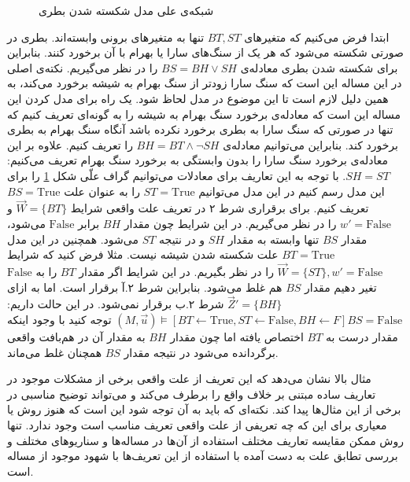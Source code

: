 \documentclass[
msc,
irfonts
]{./tex/tehran-thesis}
\newcommand{\پ}{پروژه/پایان‌نامه/رساله }
\theoremstyle{definition}
\theoremstyle{theorem}
\theoremstyle{definition}
\numberwithin{algorithm}{chapter}
\newcommand{\F}{\mathrm{False}}
\newcommand{\T}{\mathrm{True}}
\newcommand{\s}[1]{\{#1\}}
\newcommand{\la}{\leftarrow}
\begin{document}
\begin{figure}
      \centering
      \caption{شبکه‌ی علی مدل شکسته شدن بطری}
      \label{fig:hp:sb}
\end{figure}
ابتدا فرض می‌کنیم که متغیر‌های
$BT,ST$
تنها به متغیر‌های برونی وابسته‌اند.
بطری در صورتی شکسته می‌شود که هر یک از سنگ‌های سارا یا بهرام با آن برخورد کنند.
بنابراین برای شکسته شدن بطری معادله‌ی
$BS = BH \vee SH$
را در نظر می‌گیریم.
نکته‌ی اصلی در این مساله این است که سنگ سارا زودتر از سنگ بهرام به شیشه برخورد می‌کند، به همین دلیل لازم است تا این موضوع در مدل لحاظ شود.
یک راه برای مدل کردن این مساله این است که معادله‌ی برخورد سنگ بهرام به شیشه را به گونه‌ای تعریف کنیم که تنها در صورتی که سنگ سارا به بطری برخورد نکرده باشد آنگاه سنگ بهرام به بطری برخورد کند.
بنابراین می‌توانیم معادله‌ی
$BH = BT \wedge \neg SH$
را تعریف کنیم.
علاوه بر این معادله‌ی برخورد سنگ سارا را بدون وابستگی به برخورد سنگ بهرام تعریف می‌کنیم:
$SH = ST$.
با توجه به این تعاریف برای معادلات می‌توانیم گراف علّی شکل
\ref{fig:hp:sb}
را برای این مدل رسم کنیم
در این مدل می‌توانیم
$ST = \T$
را به عنوان علت
$BS = \T$
تعریف کنیم.
برای برقراری شرط ۲ در تعریف علت واقعی شرایط
$\vec W = \s{BT}$
و
$w' = \F$
را در نظر می‌گیریم.
در این شرایط چون مقدار
$BH$
برابر
$\F$
می‌شود، مقدار
$BS$
تنها وابسته به مقدار
$SH$
و در نتیجه
$ST$
می‌شود.
همچنین در این مدل
$BT = \T$
علت شکسته شدن شیشه نیست.
مثلا فرض کنید که شرایط
$\vec W = \s{ST},w' = \F$
را در نظر بگیریم.
در این شرایط اگر مقدار
$BT$
را به
$\F$
تغیر دهیم مقدار
$BS$
هم غلط می‌شود.
بنابراین شرط ۲.آ برقرار است.
اما به ازای
$\vec Z' = \s{BH}$
شرط ۲.ب برقرار نمی‌شود.
در این حالت داریم:
$(M,\vec{u})\vDash[BT \la \T,ST \la \F,BH \la F]BS = \F$
توجه کنید با وجود اینکه مقدار درست به
$BT$
اختصاص یافته اما چون مقدار
$BH$
به مقدار آن در هم‌بافت واقعی برگردانده می‌شود در نتیجه مقدار
$BS$
همچنان غلط می‌ماند.

مثال بالا نشان می‌دهد که این تعریف از علت واقعی برخی از مشکلات موجود در تعاریف ساده مبتنی بر خلاف واقع را برطرف می‌کند و می‌تواند توضیح مناسبی در برخی از این مثال‌ها پیدا کند.
نکته‌ای که باید به آن توجه شود این است که هنوز روش یا معیاری برای این که چه تعریفی از علت واقعی تعریف مناسب است وجود ندارد.
تنها روش ممکن مقایسه تعاریف مختلف استفاده از آن‌ها در مساله‌ها و سناریوهای مختلف و بررسی تطابق علت به دست آمده با استفاده از این تعریف‌ها با شهود موجود از مساله است.
\end{document}

